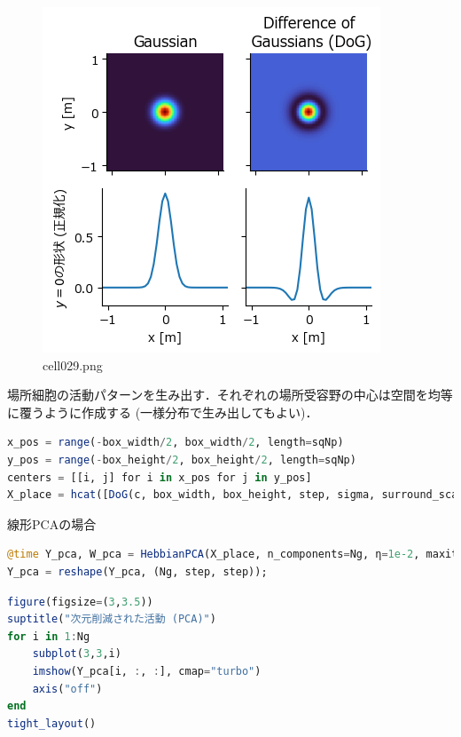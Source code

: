 \begin{figure}[ht]
	\centering
	\includegraphics[scale=0.8, max width=\linewidth]{./fig/local-learning-rule/pca-hebbian-learning/cell029.png}
	\caption{cell029.png}
	\label{cell029.png}
\end{figure}
場所細胞の活動パターンを生み出す．それぞれの場所受容野の中心は空間を均等に覆うように作成する (一様分布で生み出してもよい)．
\begin{lstlisting}[language=julia]
x_pos = range(-box_width/2, box_width/2, length=sqNp)
y_pos = range(-box_height/2, box_height/2, length=sqNp)
centers = [[i, j] for i in x_pos for j in y_pos]
X_place = hcat([DoG(c, box_width, box_height, step, sigma, surround_scale)[:] for c in centers]...)';
\end{lstlisting}
線形PCAの場合
\begin{lstlisting}[language=julia]
@time Y_pca, W_pca = HebbianPCA(X_place, n_components=Ng, η=1e-2, maxiter=5000, orthogonal=true)
Y_pca = reshape(Y_pca, (Ng, step, step));
\end{lstlisting}
\begin{lstlisting}[language=julia]
figure(figsize=(3,3.5))
suptitle("次元削減された活動 (PCA)")
for i in 1:Ng
    subplot(3,3,i)
    imshow(Y_pca[i, :, :], cmap="turbo")
    axis("off")
end
tight_layout()
\end{lstlisting}
